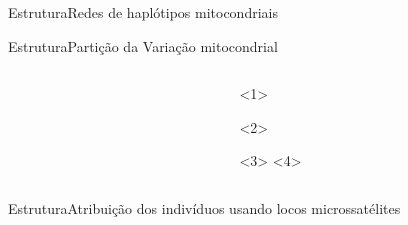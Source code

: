 \documentclass{beamer}
\begin{document}
\begin{frame}{Estrutura}{Redes de haplótipos  mitocondriais}
 \centering
      \\ 
\end{frame}




\begin{frame}{Estrutura}{Parti\c{c}ão da Varia\c{c}ão mitocondrial}

  
  \begin{columns}
    


      \begin{column}{7cm}
       \centering
      \\

    \end{column}
    \begin{column}{6cm}
      \centering
       <1>

        <2>

        <3>
        <4>
        
    \end{column}

  
  \end{columns}  

  
\end{frame} 



  
    
\begin{frame}{Estrutura}{Atribui\c{c}ão dos indivíduos usando locos microssatélites}

\end{frame}
\end{document}
